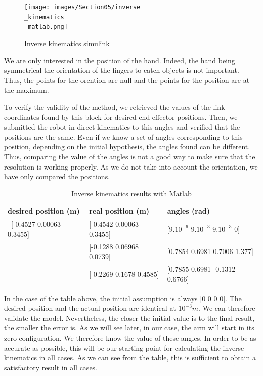 \bigbreak
\begin{figure}[ht]
    \centering
    \texttt{[image: images/Section05/inverse\\\_kinematics\\\_matlab.png]}
    \caption{Inverse kinematics simulink}
    \label{fig:mesh14}
\end{figure}
\FloatBarrier

\bigbreak
We are only interested in the position of the hand. Indeed, the hand being symmetrical the orientation of the fingers to catch objects is not important. Thus, the points for the orention are null and the points for the position are at the maximum.

\bigbreak
To verify the validity of the method, we retrieved the values of the link coordinates found by this block for desired end effector positions. Then, we submitted the robot in direct kinematics to this angles and verified that the positions are the same. Even if we know a set of angles corresponding to this position, depending on the initial hypothesis, the angles found can be different. Thus, comparing the value of the angles is not a good way to make sure that the resolution is working properly. As we do not take into account the orientation, we have only compared the positions.

\begin{table}[ht]
    \centering
    \begin{tabular}{|p{4.5cm} | p{4.5cm} | p{5cm}|} 
        \hline
        \textbf{desired position (m)} & \textbf{real position (m)} & \textbf{angles (rad)}\\ [0.3ex] 
        \hline\
        [-0.4527 0.00063 0.3455] & [-0.4542 0.00063 0.3455] & [$9.10^{-6}$ $9.10^{-3}$ $9.10^{-3}$ 0] \\ 
        \hline
        [-0.1286 0.06948 0.07537] & [-0.1288 0.06968 0.0739] & [0.7854  0.6981 0.7006 1.377] \\ 
        \hline
        [-0.2259 0.1668 0.4583] & [-0.2269 0.1678 0.4585] & [0.7855  0.6981  -0.1312 0.6766] \\ 
        \hline
    \end{tabular}
    \caption{Inverse kinematics results with Matlab}
\end{table}
\FloatBarrier

\bigbreak
In the case of the table above, the initial assumption is always [0 0 0 0]. The desired position and the actual position are identical at $10^{-3}m$. We can therefore validate the model. Nevertheless, the closer the initial value is to the final result, the smaller the error is. As we will see later, in our case, the arm will start in its zero configuration. We therefore know the value of these angles. In order to be as accurate as possible, this will be our starting point for calculating the inverse kinematics in all cases. As we can see from the table, this is sufficient to obtain a satisfactory result in all cases.

